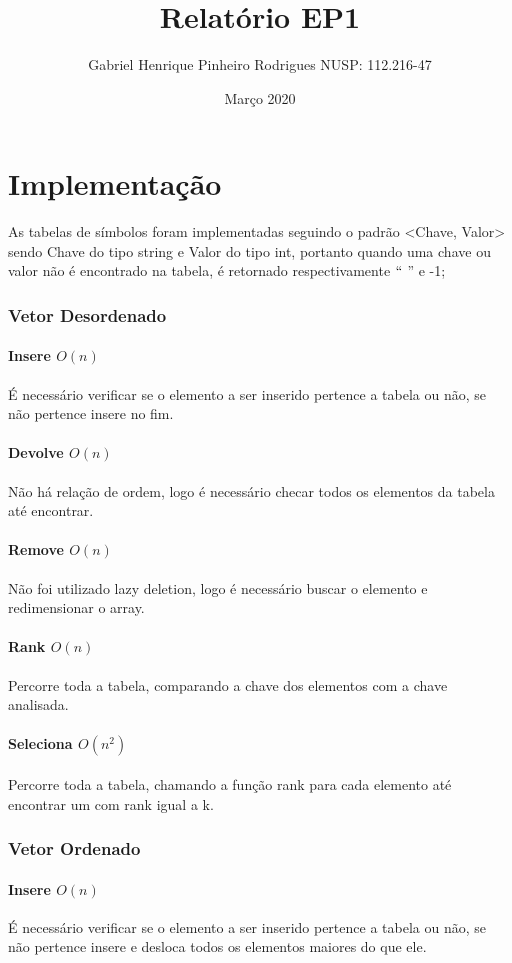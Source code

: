 \documentclass{article}
\title{Relatório EP1}
\author{Gabriel Henrique Pinheiro Rodrigues NUSP: 112.216-47}
\date{Março 2020}
\begin{document}
\maketitle

\part*{Implementação}   
As tabelas de símbolos foram implementadas seguindo o padrão <Chave, Valor> sendo Chave do tipo 
string e Valor do tipo int, portanto quando uma chave ou valor não é encontrado na tabela, é retornado
respectivamente $``$ '' e -1;

\section{Vetor Desordenado}

\subsection{Insere $O(n)$} 
É necessário verificar se o elemento a ser inserido pertence a tabela ou não, se não pertence insere no fim.
\subsection{Devolve $O(n)$}
Não há relação de ordem, logo é necessário checar todos os elementos da tabela até encontrar.
\subsection{Remove $O(n)$}
Não foi utilizado lazy deletion, logo é necessário buscar o elemento e redimensionar o array.
\subsection{Rank $O(n)$}
Percorre toda a tabela, comparando a chave dos elementos com a chave analisada.
\subsection{Seleciona $O(n^2)$}
Percorre toda a tabela, chamando a função rank para cada elemento até encontrar um com rank igual a k.

\section{Vetor Ordenado}

\subsection{Insere $O(n)$} 
É necessário verificar se o elemento a ser inserido pertence a tabela ou não, se não pertence insere 
e desloca todos os elementos maiores do que ele.
\end{document}
